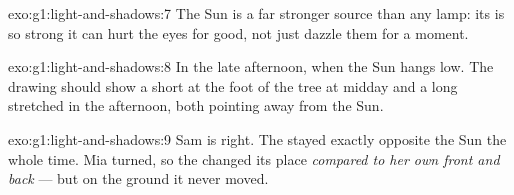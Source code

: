 \begin{solution}{exo:g1:light-and-shadows:7}
The Sun is a far stronger source than any lamp: its  is so
strong it can hurt the eyes for good, not just dazzle them for a
moment.
\end{solution}

\begin{solution}{exo:g1:light-and-shadows:8}
In the late afternoon, when the Sun hangs low. The drawing should
show a short  at the foot of the tree at midday and a long
stretched  in the afternoon, both pointing away from the Sun.
\end{solution}

\begin{solution}{exo:g1:light-and-shadows:9}
Sam is right. The  stayed exactly opposite the Sun the whole
time. Mia turned, so the  changed its place \emph{compared to
her own front and back} --- but on the ground it never moved.
\end{solution}
